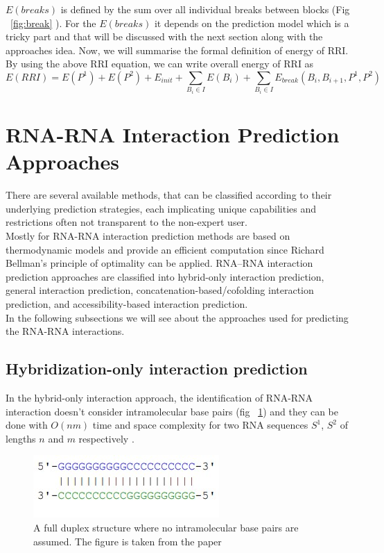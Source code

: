 \documentclass[twoside,a4paper]{report}
\begin{document}
	$E(breaks)$ is defined by the sum over all individual breaks between blocks (Fig  ~\ref{fig:break} ). For the $E(breaks)$ it depends on the prediction model which is a tricky part and that will be discussed with the next section along with the approaches idea. Now, we will summarise the formal definition of energy of RRI. By using the above RRI equation, we can write overall energy of RRI as \\
	
	\begin{equation}
	\label{eq:rri}
	E(RRI) = E(P^1)+E(P^2)+E_{init}+ \sum_{B_i \in I}E(B_i) + \sum_{B_i \in I} E_{break} (B_i,B_{i+1}, P^1, P^2)
	\end{equation}
	
	
	\section{RNA-RNA Interaction Prediction Approaches}
	There are several available methods, that can be classified according to their underlying prediction strategies, each implicating unique capabilities and restrictions often not transparent to the non-expert user.\\ 
	Mostly for RNA-RNA interaction prediction methods are based on thermodynamic models and provide an efficient computation since Richard Bellman’s principle of optimality \citep{raden2018interactive} can be applied. RNA–RNA interaction prediction approaches are classified into hybrid-only interaction prediction, general interaction prediction, concatenation-based/cofolding interaction prediction, and accessibility-based interaction prediction. \\
	
	In the following subsections we will see about the approaches used for predicting the RNA-RNA interactions.\\

	
	\subsection{Hybridization-only interaction prediction}
	In the hybrid-only interaction approach, the identification of RNA-RNA interaction doesn't consider intramolecular base pairs (fig ~\ref{Fig:rnahybrid}) and they can be done with $O(nm)$ time and space complexity for two RNA sequences $S^1$, $S^2$ of lengths $n$ and $m$ respectively \citep{tjaden2006target}.\\
	
	\begin{figure}[H]
		\includegraphics[width=0.4\linewidth]{rnahybrid}
		\centering
		\caption{ A full duplex structure where no intramolecular base pairs are assumed. The figure is taken from the paper \citep{wright2018structure}} 
		\label{Fig:rnahybrid}
	\end{figure}
	
\end{document}
